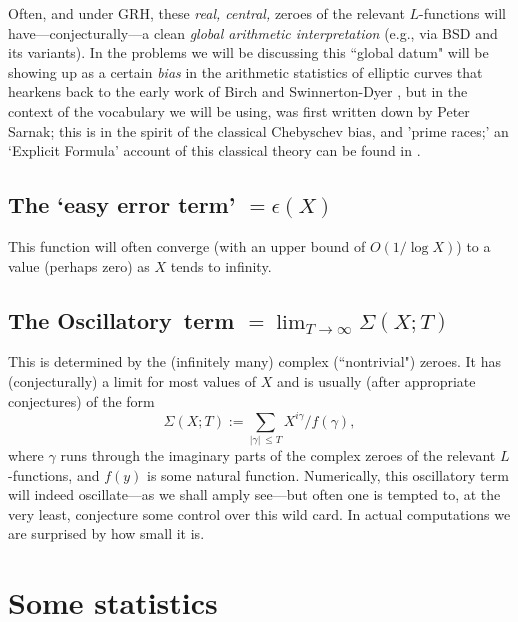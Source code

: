 \documentclass[11pt]{article}
\theoremstyle{plain}
\theoremstyle{definition}
\numberwithin{equation}{section}
\numberwithin{figure}{section}
\numberwithin{table}{section}
\begin{document}
Often, and under GRH, these {\it real,  central, }   zeroes of the relevant $L$-functions will have---conjecturally---a clean {\it global arithmetic interpretation} (e.g., via BSD and its  variants).  In the problems we will be discussing this ``global datum" will be showing up as a certain {\it bias} in the arithmetic statistics of elliptic curves that hearkens back to the early work of Birch and Swinnerton-Dyer \cite{}, but in the context of the vocabulary we will be using, was  first written down by Peter Sarnak; this is in the spirit of the classical Chebyschev bias, and 'prime races;' an `Explicit Formula' account of this classical theory can be found in {\cite{GM}}.
\subsection{The `easy error term'  $= \epsilon(X)$} This function will often  converge (with an upper bound of  $O(1/
\log{X})$) to a value  (perhaps zero) as $X$ tends to infinity.
\subsection{ The   Oscillatory\ term $= \lim_{T \to \infty} \Sigma(X; T)$} This is determined by the (infinitely many) complex (``nontrivial") zeroes.  It has (conjecturally) a limit for most values of $X$ and is usually  (after appropriate conjectures) of the form   $$\Sigma(X; T) := \sum_{|\gamma| \ \le T}X^{i\gamma}/f(\gamma),$$ where $\gamma$ runs through the imaginary parts of the complex zeroes of the relevant $L$-functions, and $f(y)$ is some natural function.  Numerically, this oscillatory term will indeed oscillate---as we shall amply see---but often one  is tempted to, at the very least, conjecture some control over this wild card.  In actual computations we are surprised by  how small it is.


\vskip20pt




 \section{Some statistics}\label{statdist}
\end{document}

